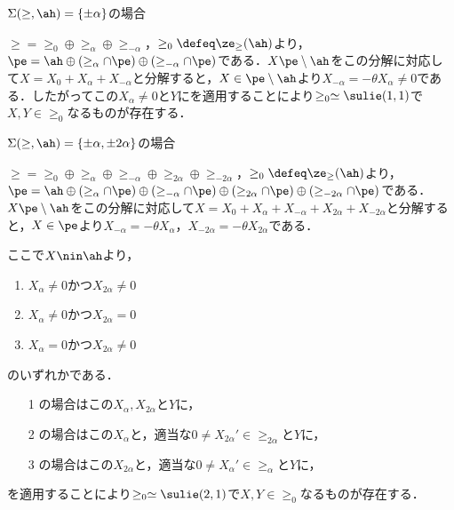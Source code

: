 \begin{pfwn}{}

  \begin{case}
    $\Sigma(\ge,\ah) = \{\pm\alpha\} $の場合

    $\ge = \ge_{0} \oplus \ge_{\alpha}\oplus \ge_{-\alpha} $，$\ge_0 \defeq \ze_{\ge}(\ah) $より，$\pe = \ah \oplus (\ge_{\alpha}\cap\pe) \oplus (\ge_{-\alpha}\cap\pe) $である．$X \pe\setminus \ah$をこの分解に対応して$X = X_0 + X_{\alpha} + X_{-\alpha} $と分解すると，$X\in \pe\setminus \ah$より$ X_{-\alpha} = -\theta X_{\alpha}\neq 0 $である．したがってこの$X_{\alpha}\neq 0 $と$Y$にを適用することにより$\ge_0\simeq \sulie(1,1)$で$X,Y\in \ge_0 $なるものが存在する．
    
  \end{case}
  
  \begin{case}
    $\Sigma(\ge,\ah) = \{\pm\alpha, \pm 2\alpha\} $の場合

    $\ge = \ge_{0} \oplus \ge_{\alpha}\oplus \ge_{-\alpha} \oplus \ge_{2\alpha}\oplus \ge_{-2\alpha}  $，$\ge_0 \defeq \ze_{\ge}(\ah) $より，$\pe = \ah \oplus (\ge_{\alpha}\cap\pe) \oplus (\ge_{-\alpha}\cap\pe)\oplus (\ge_{2\alpha}\cap\pe) \oplus (\ge_{-2\alpha}\cap\pe) $である．$X \pe\setminus \ah$をこの分解に対応して$X = X_0 + X_{\alpha} + X_{-\alpha} + X_{2\alpha} + X_{-2\alpha} $と分解すると，$X\in \pe$より$ X_{-\alpha} = - \theta X_{\alpha} $，$ X_{-2\alpha} = - \theta X_{2\alpha} $である．

    ここで$X\nin \ah$より，
    \begin{enumerate}
    \item $X_{\alpha}\neq 0 $かつ$X_{2\alpha}\neq 0 $
    \item $X_{\alpha}\neq 0 $かつ$X_{2\alpha} =  0 $
    \item $X_{\alpha} =  0 $かつ$X_{2\alpha} \neq  0 $
    \end{enumerate}
    のいずれかである．
    \begin{enumerate}
    \item[1] の場合はこの$X_{\alpha}, X_{2\alpha} $と$Y$に，
    \item[2] の場合はこの$X_{\alpha}$と，適当な$0\neq X_{2\alpha}'\in \ge_{2\alpha} $と$Y$に，
    \item[3] の場合はこの$X_{2\alpha}$と，適当な$0\neq X_{\alpha}'\in \ge_{\alpha} $と$Y$に，
    \end{enumerate}
    を適用することにより$\ge_0\simeq \sulie(2,1)$で$X,Y\in \ge_0 $なるものが存在する．
    
  \end{case}
  
  
\end{pfwn}

